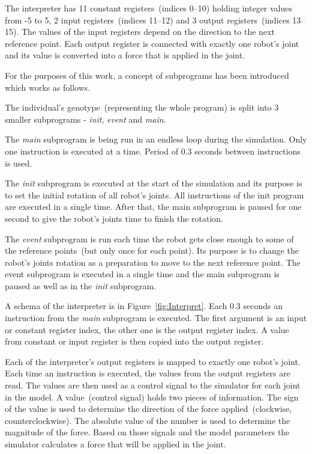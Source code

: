 \documentclass{ExcelAtFIT}
\begin{document}
The interpreter has 11 constant registers~(indices 0–10) holding integer values from -5 to 5, 2 input registers~(indices 11–12) and 3 output registers~(indices 13–15).
The values of the input registers depend on the direction to the next reference point.
Each output register is connected with exactly one robot's joint and its value is converted into a force that is applied in the joint.

For the purposes of this work, a concept of subprograms has been introduced which works as follows.

The individual's genotype~(representing the whole program) is split into 3 smaller subprograms - \textit{init}, \textit{event} and \textit{main}.

The \textit{main} subprogram is being run in an endless loop during the simulation.
Only one instruction is executed at a time.
Period of 0.3 seconds between instructions is used.

The \textit{init} subprogram is executed at the start of the simulation and its purpose is to set the initial rotation of all robot's joints.
All instructions of the init program are executed in a single time.
After that, the main subprogram is paused for one second to give the robot's joints time to finish the rotation.

The \textit{event} subprogram is run each time the robot gets close enough to some of the reference points~(but only once for each point).
Its purpose is to change the robot's joints rotation as a preparation to move to the next reference point.
The event subprogram is executed in a single time and the main subprogram is paused as well as in the \textit{init} subprogram.

A schema of the interpreter is in Figure~\ref{fig:Interpret}.
Each 0.3 seconds an instruction from the \textit{main} subprogram is executed.
The first argument is an input or constant register index, the other one is the output register index.
A value from constant or input register is then copied into the output register.

Each of the interpreter's output registers is mapped to exactly one robot's joint.
Each time an instruction is executed, the values from the output registers are read.
The values are then used as a control signal to the simulator for each joint in the model.
A value~(control signal) holds two pieces of information.
The sign of the value is used to determine the direction of the force applied~(clockwise, counterclockwise).
The absolute value of the number is used to determine the magnitude of the force.
Based on those signals and the model parameters the simulator calculates a force that will be applied in the joint.
\end{document}
